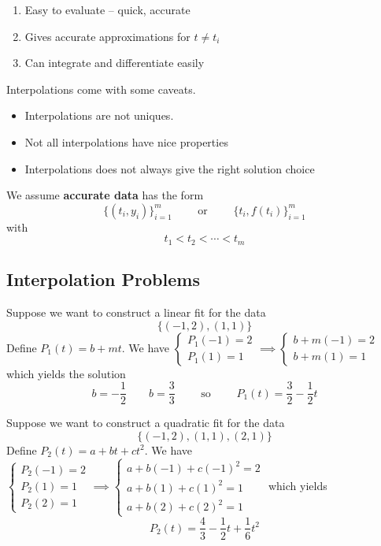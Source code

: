 \begin{enumerate}
    \item Easy to evaluate -- quick, accurate
    \item Gives accurate approximations for \( t \neq t_i \)
    \item Can integrate and differentiate easily
\end{enumerate}

\begin{remark}[Caveats]
    Interpolations come with some caveats.

    \begin{itemize}
        \item Interpolations are not uniques.
        \item Not all interpolations have nice properties
        \item Interpolations does not always give the right solution choice
    \end{itemize}
\end{remark}

\begin{note}
    We assume \textbf{accurate data} has the form \[ \{ (t_i, y_i) \}_{i=1}^m \qquad \text{ or } \qquad \{ t_i, f(t_i) \}_{i=1}^m \] with \[ t_1 < t_2 < \cdots < t_m \]
\end{note}

\subsection{Interpolation Problems}

\begin{example}
    Suppose we want to construct a linear fit for the data \[
        \{ (-1, 2), (1, 1) \}
    \]
    Define \( P_1(t) = b + mt \). We have \( \begin{cases} P_1(-1) = 2 \\ P_1(1) = 1 \end{cases} \implies \begin{cases} b + m (-1) = 2 \\ b + m (1) = 1 \end{cases} \) which yields the solution \[
        b = -\frac{1}{2} \qquad b = \frac{3}{3} \qquad \text{ so } \qquad P_1(t) = \frac{3}{2} - \frac{1}{2}t
    \]
\end{example}

\begin{example}
    Suppose we want to construct a quadratic fit for the data \[
        \{ (-1, 2), (1, 1), (2, 1) \}
    \]
    Define \( P_2(t) = a + bt + ct^2 \). We have \( \begin{cases} P_2(-1) = 2 \\ P_2(1) = 1 \\ P_2(2) = 1 \end{cases} \implies \begin{cases} a + b(-1) + c(-1)^2 = 2 \\ a + b(1) + c(1)^2 = 1 \\ a + b(2) + c(2)^2 = 1 \end{cases} \) which yields \[
        P_2(t) = \frac{4}{3} - \frac{1}{2}t + \frac{1}{6}t^2
    \]
\end{example}

